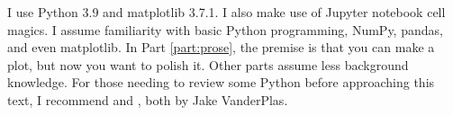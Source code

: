 I use Python 3.9 and matplotlib 3.7.1. I also make use of Jupyter notebook cell magics. I assume familiarity with basic Python programming, NumPy, pandas, and even matplotlib. In Part \ref{part:prose}, the premise is that you can make a plot, but now you want to polish it. Other parts assume less background knowledge. For those needing to review some Python before approaching this text, I recommend  and , both by Jake VanderPlas.

